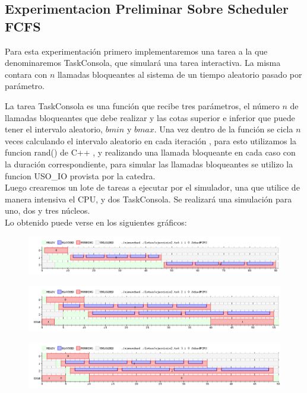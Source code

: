 \subsection{Experimentacion Preliminar Sobre Scheduler FCFS}

Para esta experimentación primero implementaremos una tarea a la que denominaremos TaskConsola, que simulará una tarea interactiva. La misma contara con $n$ llamadas bloqueantes al sistema de un tiempo aleatorio pasado por parámetro. 

La tarea TaskConsola es una función que recibe tres parámetros, el número $n$ de llamadas bloqueantes que debe realizar y las cotas superior e inferior que puede tener el intervalo aleatorio, $bmin$ y $bmax$. Una vez dentro de la función se cicla $n$ veces calculando el intervalo aleatorio en cada iteración , para esto utilizamos la funcion rand() de C++ , y realizando una llamada bloqueante en cada caso con la duración correspondiente, para simular las llamadas bloqueantes se utilizo la funcion USO_IO provista por la catedra.
\\
Luego crearemos un lote de tareas a ejecutar por el simulador, una que utilice de manera intensiva el CPU, y dos TaskConsola. Se realizará una simulación para uno, dos y tres núcleos.
\\
Lo obtenido puede verse en los siguientes gráficos:
\\
\begin{figure}[H]
  \centering
	\includegraphics[scale=0.45]{graficos/parte1/testFCFS1.png}
  \caption[Caption for LOF]{}
\end{figure}
\begin{figure}[H]
  \centering
	\includegraphics[scale=0.45]{graficos/parte1/testFCFS2.png}
  \caption[Caption for LOF]{}
\end{figure}
\begin{figure}[H]
  \centering
	\includegraphics[scale=0.45]{graficos/parte1/testFCFS3.png}
  \caption[Caption for LOF]{}
\end{figure}

